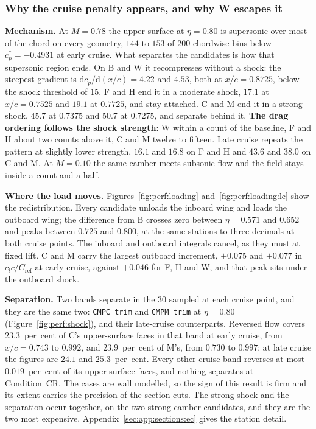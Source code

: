 \subsubsection{Why the cruise penalty appears, and why W escapes it}
\label{sec:perf:mechanism}
\textbf{Mechanism.} At $M = 0.78$ the upper surface at $\eta = 0.80$ is supersonic over most of
the chord on every geometry, $144$ to $153$ of $200$ chordwise bins below
$c_p^{*}=-0.4931$ at early cruise. What separates the candidates is how that supersonic region
ends. On B and W it recompresses without a shock: the steepest gradient is
$\mathrm{d}c_p/\mathrm{d}(x/c) = 4.22$ and $4.53$, both at $x/c = 0.8725$, below the shock
threshold of $15$. F and H end it in a moderate shock, $17.1$ at $x/c = 0.7525$ and $19.1$ at
$0.7725$, and stay attached. C and M end it in a strong shock, $45.7$ at $0.7375$ and $50.7$ at
$0.7275$, and separate behind it. \textbf{The drag ordering follows the shock strength}: W within
a count of the baseline, F and H about two counts above it, C and M twelve to fifteen. Late cruise
repeats the pattern at slightly lower strength, $16.1$ and $16.8$ on F and H and $43.6$ and
$38.0$ on C and M. At $M=0.10$ the same camber meets subsonic flow and the field stays inside a
count and a half.

\textbf{Where the load moves.} Figures~\ref{fig:perf:loading} and~\ref{fig:perf:loading:lc} show
the redistribution. Every candidate unloads the inboard wing and loads the outboard wing; the
difference from B crosses zero between $\eta = 0.571$ and $0.652$ and peaks between $0.725$ and
$0.800$, at the same stations to three decimals at both cruise points. The inboard and outboard
integrals cancel, as they must at fixed lift. C and M carry the largest outboard increment,
$+0.075$ and $+0.077$ in $c_l c/C_\mathrm{ref}$ at early cruise, against $+0.046$ for F, H and W,
and that peak sits under the outboard shock.

\textbf{Separation.} Two bands separate in the 30 sampled at each cruise point, and they are the
same two: \texttt{CMPC\_trim} and \texttt{CMPM\_trim} at $\eta = 0.80$
(Figure~\ref{fig:perf:shock}), and their late-cruise counterparts. Reversed flow covers
$23.3$~per~cent of C's upper-surface faces in that band at early cruise, from $x/c = 0.743$ to
$0.992$, and $23.9$~per~cent of M's, from $0.730$ to $0.997$; at late cruise the figures are
$24.1$ and $25.3$~per~cent. Every other cruise band reverses at most $0.019$~per~cent of its
upper-surface faces, and nothing separates at Condition~CR. The cases are wall modelled, so the
sign of this result is firm and its extent carries the precision of the section cuts. The strong
shock and the separation occur together, on the two strong-camber candidates, and they are the
two most expensive. Appendix~\ref{sec:app:sections:ec} gives the station detail.

